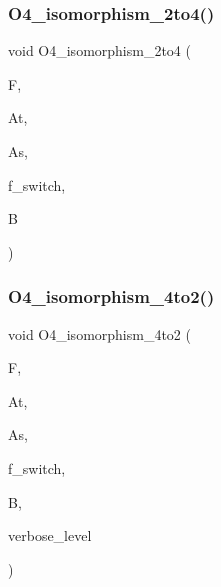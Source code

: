 \subsubsection{\texorpdfstring{O4\+\_\+isomorphism\+\_\+2to4()}{O4\_isomorphism\_2to4()}}
{\footnotesize\ttfamily void O4\+\_\+isomorphism\+\_\+2to4 (\begin{DoxyParamCaption}\item[{\mbox{\hyperlink{classfinite__field}{finite\+\_\+field}} $\ast$}]{F,  }\item[{\mbox{\hyperlink{galois_8h_a09fddde158a3a20bd2dcadb609de11dc}{I\+NT}} $\ast$}]{At,  }\item[{\mbox{\hyperlink{galois_8h_a09fddde158a3a20bd2dcadb609de11dc}{I\+NT}} $\ast$}]{As,  }\item[{\mbox{\hyperlink{galois_8h_a09fddde158a3a20bd2dcadb609de11dc}{I\+NT}}}]{f\+\_\+switch,  }\item[{\mbox{\hyperlink{galois_8h_a09fddde158a3a20bd2dcadb609de11dc}{I\+NT}} $\ast$}]{B }\end{DoxyParamCaption})}

\mbox{\label{group__generators_8_c_a53847fa0202e69f87b2131f09fa1ff89}} 
\subsubsection{\texorpdfstring{O4\+\_\+isomorphism\+\_\+4to2()}{O4\_isomorphism\_4to2()}}
{\footnotesize\ttfamily void O4\+\_\+isomorphism\+\_\+4to2 (\begin{DoxyParamCaption}\item[{\mbox{\hyperlink{classfinite__field}{finite\+\_\+field}} $\ast$}]{F,  }\item[{\mbox{\hyperlink{galois_8h_a09fddde158a3a20bd2dcadb609de11dc}{I\+NT}} $\ast$}]{At,  }\item[{\mbox{\hyperlink{galois_8h_a09fddde158a3a20bd2dcadb609de11dc}{I\+NT}} $\ast$}]{As,  }\item[{\mbox{\hyperlink{galois_8h_a09fddde158a3a20bd2dcadb609de11dc}{I\+NT}} \&}]{f\+\_\+switch,  }\item[{\mbox{\hyperlink{galois_8h_a09fddde158a3a20bd2dcadb609de11dc}{I\+NT}} $\ast$}]{B,  }\item[{\mbox{\hyperlink{galois_8h_a09fddde158a3a20bd2dcadb609de11dc}{I\+NT}}}]{verbose\+\_\+level }\end{DoxyParamCaption})}

